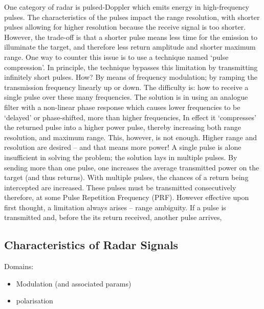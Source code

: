 One category of radar is pulsed-Doppler which emits energy in high-frequency pulses. The characteristics of the pulses impact the range resolution, with shorter pulses allowing for higher resolution because the receive signal is too shorter. However, the trade-off is that a shorter pulse means less time for the emission to illuminate the target, and therefore less return amplitude and shorter maximum range. One way to counter this issue is to use a technique named ‘pulse compression’. In principle, the technique bypasses this limitation by transmitting infinitely short pulses. How? By means of frequency modulation; by ramping the transmission frequency linearly up or down. The difficulty is: how to receive a single pulse over these many frequencies. The solution is in using an analogue filter with a non-linear phase response which causes lower frequencies to be ‘delayed’ or phase-shifted, more than higher frequencies, In effect it ‘compresses’ the returned pulse into a higher power pulse, thereby increasing both range resolution, and maximum range. This, however, is not enough. Higher range and resolution are desired – and that means more power! A single pulse is alone insufficient in solving the problem; the solution lays in multiple pulses. By sending more than one pulse, one increases the average transmitted power on the target (and thus returns). With multiple pulses, the chances of a return being intercepted are increased. These pulses must be transmitted consecutively therefore, at some Pulse Repetition Frequency (PRF). However effective upon first thought, a limitation always arises – range ambiguity. If a pulse is transmitted and, before the its return received, another pulse arrives,  \cite{parker_chapter_2010}


\subsection{Characteristics of Radar Signals}

Domains: 
\begin{itemize}
    \item Modulation (and associated params)
    \item polarisation
\end{itemize}

